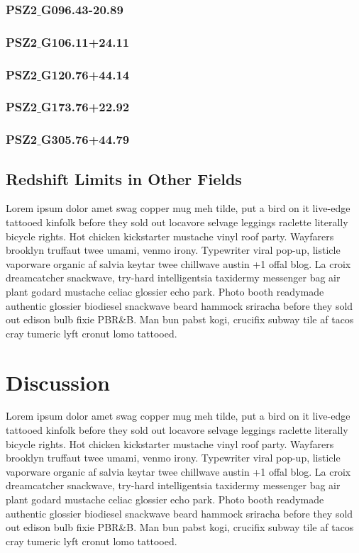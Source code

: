\documentclass[apj, revtex4]{emulateapj}
\begin{document}
\subsubsection{PSZ2$\_$G096.43-20.89}

\subsubsection{PSZ2$\_$G106.11+24.11}

\subsubsection{PSZ2$\_$G120.76+44.14}

\subsubsection{PSZ2$\_$G173.76+22.92}

\subsubsection{PSZ2$\_$G305.76+44.79}

\subsection{Redshift Limits in Other Fields}

Lorem ipsum dolor amet swag copper mug meh tilde, put a bird on it live-edge tattooed kinfolk before they sold out locavore selvage leggings raclette literally bicycle rights. Hot chicken kickstarter mustache vinyl roof party. Wayfarers brooklyn truffaut twee umami, venmo irony. Typewriter viral pop-up, listicle vaporware organic af salvia keytar twee chillwave austin +1 offal blog. La croix dreamcatcher snackwave, try-hard intelligentsia taxidermy messenger bag air plant godard mustache celiac glossier echo park. Photo booth readymade authentic glossier biodiesel snackwave beard hammock sriracha before they sold out edison bulb fixie PBR\&B. Man bun pabst kogi, crucifix subway tile af tacos cray tumeric lyft cronut lomo tattooed.

\section{Discussion}\label{sec:discussion}

Lorem ipsum dolor amet swag copper mug meh tilde, put a bird on it live-edge tattooed kinfolk before they sold out locavore selvage leggings raclette literally bicycle rights. Hot chicken kickstarter mustache vinyl roof party. Wayfarers brooklyn truffaut twee umami, venmo irony. Typewriter viral pop-up, listicle vaporware organic af salvia keytar twee chillwave austin +1 offal blog. La croix dreamcatcher snackwave, try-hard intelligentsia taxidermy messenger bag air plant godard mustache celiac glossier echo park. Photo booth readymade authentic glossier biodiesel snackwave beard hammock sriracha before they sold out edison bulb fixie PBR\&B. Man bun pabst kogi, crucifix subway tile af tacos cray tumeric lyft cronut lomo tattooed.
\end{document}
